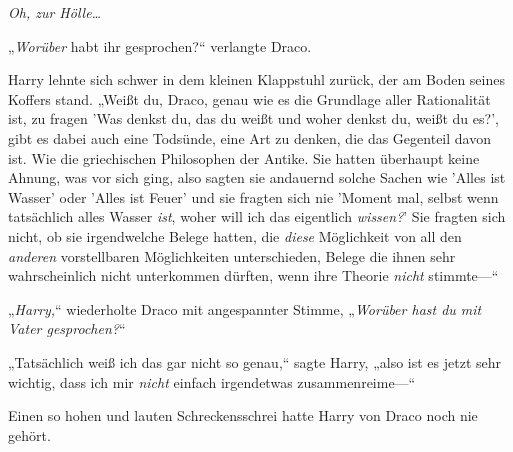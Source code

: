 \emph{Oh, zur Hölle…}

„\emph{Worüber} habt ihr gesprochen?“ verlangte Draco.

Harry lehnte sich schwer in dem kleinen Klappstuhl zurück, der am Boden seines Koffers stand. „Weißt du, Draco, genau wie es die Grundlage aller Rationalität ist, zu fragen 'Was denkst du, das du weißt und woher denkst du, weißt du es?', gibt es dabei auch eine Todsünde, eine Art zu denken, die das Gegenteil davon ist. Wie die griechischen Philosophen der Antike. Sie hatten überhaupt keine Ahnung, was vor sich ging, also sagten sie andauernd solche Sachen wie 'Alles ist Wasser' oder 'Alles ist Feuer' und sie fragten sich nie 'Moment mal, selbst wenn tatsächlich alles Wasser \emph{ist}, woher will ich das eigentlich \emph{wissen?}' Sie fragten sich nicht, ob sie irgendwelche Belege hatten, die \emph{diese} Möglichkeit von all den \emph{anderen} vorstellbaren Möglichkeiten unterschieden, Belege die ihnen sehr wahrscheinlich nicht unterkommen dürften, wenn ihre Theorie \emph{nicht} stimmte—“

„\emph{Harry,}“ wiederholte Draco mit angespannter Stimme, „\emph{Worüber hast du mit Vater gesprochen?}“

„Tatsächlich weiß ich das gar nicht so genau,“ sagte Harry, „also ist es jetzt sehr wichtig, dass ich mir \emph{nicht} einfach irgendetwas zusammenreime—“

Einen so hohen und lauten Schreckensschrei hatte Harry von Draco noch nie gehört.

